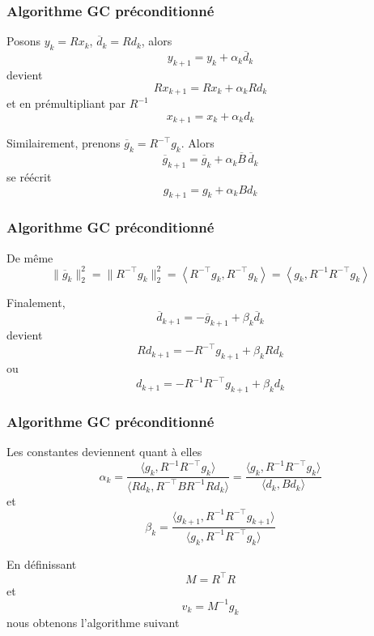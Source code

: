 \documentclass[usepdftitle=false,aspectratio=169]{beamer}
\begin{document}
\begin{frame}
\frametitle{Algorithme GC préconditionné}

Posons $y_k = Rx_k$, $\overline{d}_k = Rd_k$, alors
$$
y_{k+1} = y_k + \alpha_k \overline{d}_k
$$
devient
$$
Rx_{k+1} = Rx_k + \alpha_k Rd_k
$$
et en prémultipliant par $R^{-1}$
$$
x_{k+1} = x_k + \alpha_k d_k
$$

\mbox{}

Similairement, prenons $\overline{g}_k = R^{-\top} g_k$.
Alors
$$
\overline{g}_{k+1} = \overline{g}_k + \alpha_k \overline{B}\, \overline{d}_k
$$
se réécrit
$$
g_{k+1} = g_k + \alpha_k B d_k
$$

\end{frame}

\begin{frame}
\frametitle{Algorithme GC préconditionné}

De même
$$
\| \overline{g}_k \|^2_2
= \| R^{-\top}g_k \|^2_2
= \left\langle R^{-\top}g_k, R^{-\top}g_k \right\rangle
= \left\langle g_k, R^{-1}R^{-\top}g_k \right\rangle
$$

\mbox{}

Finalement,
$$
\overline{d}_{k+1} = -\overline{g}_{k+1} + \beta_k \overline{d}_k
$$
devient
$$
Rd_{k+1} = -R^{-\top}g_{k+1} + \beta_k Rd_k
$$
ou
$$
d_{k+1} = -R^{-1}R^{-\top}g_{k+1} + \beta_k d_k
$$

\end{frame}

\begin{frame}
\frametitle{Algorithme GC préconditionné}

Les constantes deviennent quant à elles
$$
\alpha_k = \frac{\langle g_k, R^{-1}R^{-\top}g_k \rangle}{\langle Rd_k, R^{-\top}BR^{-1} Rd_k\rangle}
= \frac{\langle g_k, R^{-1}R^{-\top}g_k \rangle}{\langle d_k, B d_k \rangle}
$$
et
$$
\beta_k = \frac{\langle g_{k+1}, R^{-1}R^{-\top}g_{k+1} \rangle}{\langle g_k, R^{-1}R^{-\top}g_k \rangle}
$$

\mbox{}

En définissant
$$
M = R^{\top}R
$$
et
$$
v_k = M^{-1}g_k
$$
nous obtenons l'algorithme suivant

\end{frame}
\end{document}
